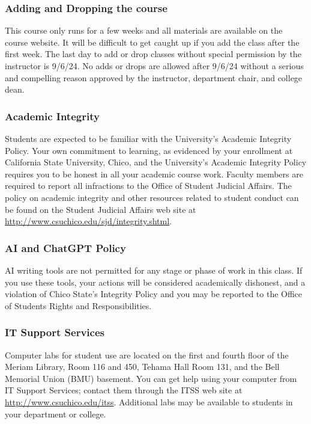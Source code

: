 \documentclass[
  11pt,
]{article}
\begin{document}
\subsubsection{Adding and Dropping the
course}\label{adding-and-dropping-the-course}

This course only runs for a few weeks and all materials are available on
the course website. It will be difficult to get caught up if you add the
class after the first week. The last day to add or drop classes without
special permission by the instructor is 9/6/24. No adds or drops are
allowed after 9/6/24 without a serious and compelling reason approved by
the instructor, department chair, and college dean.

\subsubsection{Academic Integrity}\label{academic-integrity}

Students are expected to be familiar with the University's Academic
Integrity Policy. Your own commitment to learning, as evidenced by your
enrollment at California State University, Chico, and the University's
Academic Integrity Policy requires you to be honest in all your academic
course work. Faculty members are required to report all infractions to
the Office of Student Judicial Affairs. The policy on academic integrity
and other resources related to student conduct can be found on the
Student Judicial Affairs web site at
\url{http://www.csuchico.edu/sjd/integrity.shtml}.

\subsubsection{AI and ChatGPT Policy}\label{ai-and-chatgpt-policy}

AI writing tools are not permitted for any stage or phase of work in
this class. If you use these tools, your actions will be considered
academically dishonest, and a violation of Chico State's Integrity
Policy and you may be reported to the Office of Students Rights and
Responsibilities.

\subsubsection{IT Support Services}\label{it-support-services}

Computer labs for student use are located on the first and fourth floor
of the Meriam Library, Room 116 and 450, Tehama Hall Room 131, and the
Bell Memorial Union (BMU) basement. You can get help using your computer
from IT Support Services; contact them through the ITSS web site at
\url{http://www.csuchico.edu/itss}. Additional labs may be available to
students in your department or college.
\end{document}
